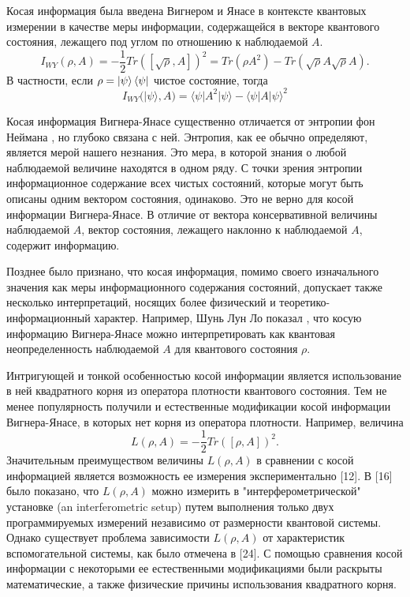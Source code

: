 Косая информация\cite{Wigner1963} была введена Вигнером и Янасе 
в контексте квантовых измерении в качестве меры информации,
содержащейся в векторе квантового состояния, лежащего под углом по отношению к наблюдаемой $A$.
\begin{equation}\label{eq:wyi}
  I_{WY}(\rho, A)
  = -\frac{1}{2} Tr([\sqrt{\rho}, A])^2
  = Tr(\rho A^2) - Tr(\sqrt \rho A \sqrt \rho  A ).
\end{equation}    
% 
В частности, если $\rho = \left| \psi \right\rangle\left\langle \psi \right|$ чистое состояние, тогда 
%
\begin{equation}
  I_{WY}(| \psi \rangle, A)
  = \langle \psi | A^2 | \psi \rangle - \langle \psi | A| \psi \rangle ^2
\end{equation}
  
Косая информация Вигнера-Янасе существенно отличается от энтропии фон Неймана \cite{Wigner1960, Lieb1973prl, Lieb1973, Wehrl1978}, 
но глубоко связана с ней.
Энтропия, как ее обычно определяют, является мерой нашего незнания\cite{Weaver1949}.
Это мера, в которой знания о любой наблюдаемой величине находятся в одном ряду.
С точки зрения энтропии информационное содержание всех чистых состояний,
которые могут быть описаны одним вектором состояния, одинаково. 
Это не верно для косой информации Вигнера-Янасе.
В отличие от вектора консервативной величины наблюдаемой $A$, 
вектор состояния, лежащего наклонно к наблюдаемой $A$, содержит информацию.

Позднее было признано, что косая информация, 
помимо своего изначального значения как меры информационного содержания состояний,
допускает также несколько интерпретаций, 
носящих более физический и теоретико-информационный характер. 
Например, Шунь Лун Ло показал\cite{Luo2003, Luo2005, Luo2005pra, Luo2006, Luo2017} , 
что косую информацию Вигнера-Янасе можно интерпретировать
как квантовая неопределенность наблюдаемой $A$ для квантового состояния $\rho$.

Интригующей и тонкой особенностью косой информации является использование в ней квадратного корня из оператора плотности квантового состояния. 
Тем не менее популярность получили и естественные модификации косой информации Вигнера-Янасе, 
в которых нет корня из оператора плотности.
Например, величина
%
\begin{equation}\label{eq:wyi-modification-l}
  L(\rho, A)
  = -\frac{1}{2} Tr([\rho, A])^2.
\end{equation} 
%
Значительным преимуществом величины $L(\rho, A)$ в сравнении с косой информацией является возможность ее измерения экспериментально [12]. 
В [16] было показано, 
что $L(\rho, A)$ можно измерить в "интерферометрической" установке (an interferometric setup) путем выполнения только двух программируемых измерений независимо от размерности квантовой системы.
Однако существует проблема зависимости $L(\rho, A)$ от характеристик вспомогательной системы, как было отмечена в [24].
С помощью сравнения косой информации с некоторыми ее естественными модификациями были раскрыты\cite{Luo2020} математические, 
а также физические причины использования квадратного корня. 

